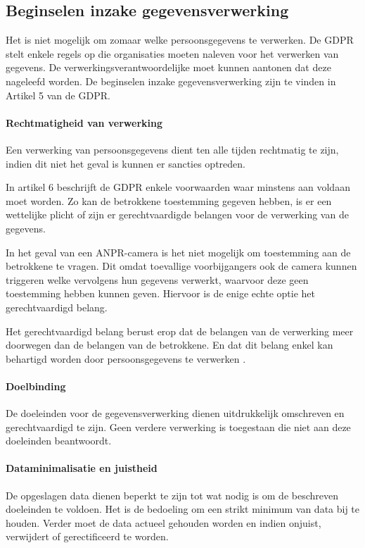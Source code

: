 \subsection{Beginselen inzake gegevensverwerking}
Het is niet mogelijk om zomaar welke persoonsgegevens te verwerken. De GDPR stelt enkele regels op die organisaties moeten naleven voor het verwerken van gegevens. De verwerkingsverantwoordelijke moet kunnen aantonen dat deze nageleefd worden. De beginselen inzake gegevensverwerking zijn te vinden in Artikel 5 van de GDPR.

\paragraph{Rechtmatigheid van verwerking}
\label{rechtmatigheid-van-verwerking}
Een verwerking van persoonsgegevens dient ten alle tijden rechtmatig te zijn, indien dit niet het geval is kunnen er sancties optreden.

In artikel 6 beschrijft de GDPR enkele voorwaarden waar minstens aan voldaan moet worden. Zo kan de betrokkene toestemming gegeven hebben, is er een wettelijke plicht of zijn er gerechtvaardigde belangen voor de verwerking van de gegevens.

In het geval van een ANPR-camera is het niet mogelijk om toestemming aan de betrokkene te vragen. Dit omdat toevallige voorbijgangers ook de camera kunnen triggeren welke vervolgens hun gegevens verwerkt, waarvoor deze geen toestemming hebben kunnen geven. Hiervoor is de enige echte optie het gerechtvaardigd belang.

Het gerechtvaardigd belang berust erop dat de belangen van de verwerking meer doorwegen dan de belangen van de betrokkene. En dat dit belang enkel kan behartigd worden door persoonsgegevens te verwerken \autocite{autoriteit2019gerechtvaardigd}.

\paragraph{Doelbinding}
De doeleinden voor de gegevensverwerking dienen uitdrukkelijk omschreven en gerechtvaardigd te zijn. Geen verdere verwerking is toegestaan die niet aan deze doeleinden beantwoordt.

\paragraph{Dataminimalisatie en juistheid}
De opgeslagen data dienen beperkt te zijn tot wat nodig is om de beschreven doeleinden te voldoen. Het is de bedoeling om een strikt minimum van data bij te houden. Verder moet de data actueel gehouden worden en indien onjuist, verwijdert of gerectificeerd te worden.

